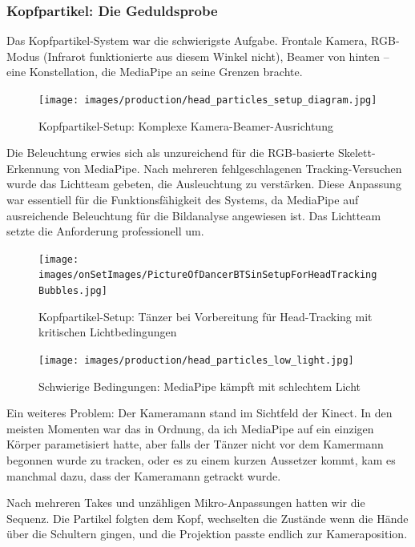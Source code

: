 \newpage

\subsubsection{Kopfpartikel: Die Geduldsprobe}

Das Kopfpartikel-System war die schwierigste Aufgabe. Frontale Kamera, RGB-Modus (Infrarot funktionierte aus diesem Winkel nicht), Beamer von hinten – eine Konstellation, die MediaPipe an seine Grenzen brachte.

\begin{figure}[h]
   \centering
   \texttt{[image: images/production/head\_particles\_setup\_diagram.jpg]}
   \caption{Kopfpartikel-Setup: Komplexe Kamera-Beamer-Ausrichtung}
   \label{fig:head_setup}
\end{figure}

Die Beleuchtung erwies sich als unzureichend für die RGB-basierte Skelett-Erkennung von MediaPipe. Nach mehreren fehlgeschlagenen Tracking-Versuchen wurde das Lichtteam gebeten, die Ausleuchtung zu verstärken. Diese Anpassung war essentiell für die Funktionsfähigkeit des Systems, da MediaPipe auf ausreichende Beleuchtung für die Bildanalyse angewiesen ist. Das Lichtteam setzte die Anforderung professionell um.

\begin{figure}[h]
   \centering
   \texttt{[image: images/onSetImages/PictureOfDancerBTSinSetupForHeadTrackingBubbles.jpg]}
   \caption{Kopfpartikel-Setup: Tänzer bei Vorbereitung für Head-Tracking mit kritischen Lichtbedingungen}
   \label{fig:dancer_head_tracking}
\end{figure}

\begin{figure}[h]
   \centering
   \texttt{[image: images/production/head\_particles\_low\_light.jpg]}
   \caption{Schwierige Bedingungen: MediaPipe kämpft mit schlechtem Licht}
   \label{fig:low_light_tracking}
\end{figure}

Ein weiteres Problem: Der Kameramann stand im Sichtfeld der Kinect. In den meisten Momenten war das in Ordnung, da ich MediaPipe auf ein einzigen Körper parametisiert hatte, aber falls der Tänzer nicht vor dem Kamermann begonnen wurde zu tracken, oder es zu einem kurzen Aussetzer kommt, kam es manchmal dazu, dass der Kameramann getrackt wurde.

Nach mehreren Takes und unzähligen Mikro-Anpassungen hatten wir die Sequenz. Die Partikel folgten dem Kopf, wechselten die Zustände wenn die Hände über die Schultern gingen, und die Projektion passte endlich zur Kameraposition.

